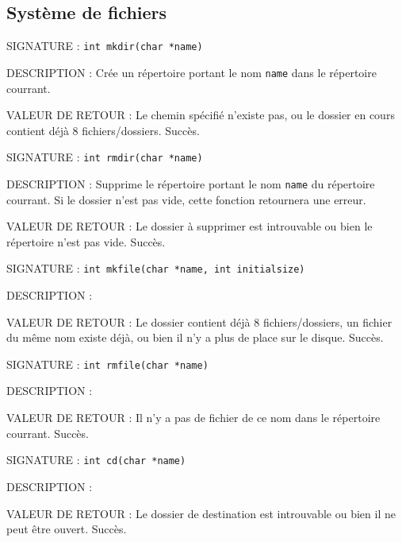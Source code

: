 \documentclass{article}
\begin{document}
	\subsection{Système de fichiers}
		\begin{description}
			\item{SIGNATURE : } \texttt{int mkdir(char *name)}
			\item{DESCRIPTION : } Crée un répertoire portant le nom \texttt{name} dans le répertoire courrant.
			\item{VALEUR DE RETOUR : } 
				 Le chemin spécifié n'existe pas, ou le dossier en cours contient déjà 8 fichiers/dossiers.
				 Succès.
		\end{description}
		\vspace{2.5mm}
		\begin{description}
			\item{SIGNATURE : } \texttt{int rmdir(char *name)}
			\item{DESCRIPTION : } Supprime le répertoire portant le nom \texttt{name} du répertoire courrant. Si le dossier n'est pas vide, cette fonction retournera une erreur.
			\item{VALEUR DE RETOUR : } 
				 Le dossier à supprimer est introuvable ou bien le répertoire n'est pas vide.
				\subitem{\texttt{1} : } Succès.
		\end{description}
		\vspace{2.5mm}
		\begin{description}
			\item{SIGNATURE : } \texttt{int mkfile(char *name, int initialsize)}
			\item{DESCRIPTION : } 
			\item{VALEUR DE RETOUR : } 
				 Le dossier contient déjà 8 fichiers/dossiers, un fichier du même nom existe déjà, ou bien il n'y a plus de place sur le disque.
				 Succès.
		\end{description}
		\vspace{2.5mm}
		\begin{description}
			\item{SIGNATURE : } \texttt{int rmfile(char *name)}
			\item{DESCRIPTION : } 
			\item{VALEUR DE RETOUR : } 
				 Il n'y a pas de fichier de ce nom dans le répertoire courrant.
				\subitem{\texttt{1} : } Succès.
		\end{description}
		\vspace{2.5mm}
		\begin{description}
			\item{SIGNATURE : } \texttt{int cd(char *name)}
			\item{DESCRIPTION : } 
			\item{VALEUR DE RETOUR : } 
				 Le dossier de destination est introuvable ou bien il ne peut être ouvert.
				 Succès.
		\end{description}
		\vspace{2.5mm}
	
\end{document}
